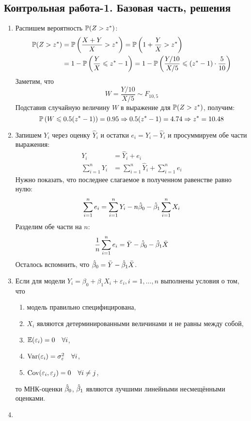 \subsection{Контрольная работа-1. Базовая часть, решения}

\begin{enumerate}
\item Распишем вероятность $\P(Z >z^*)$:
\begin{align*}
\P(Z >z^*) &= \P \left(\frac{X+Y}{X} > z^* \right) = \P \left(1 + \frac{Y}{X} > z^* \right) \\
&= 1 - \P\left(\frac{Y}{X} \leq z^* - 1 \right) = 1 - \P\left(\frac{Y/10}{X/5} \leq \left(z^* - 1\right) \cdot \frac{5}{10} \right)
\end{align*}
Заметим, что
\[
W = \frac{Y/10}{X/5} \sim F_{10,5}
\]
Подставив случайную величину $W$ в выражение для $\P(Z >z^*)$, получим:
\[
\P\left(W \leq 0.5(z^* - 1) \right) = 0.95 \Rightarrow 0.5(z^* - 1) = 4.74 \Rightarrow z^* = 10.48
\]
\item Запишем $Y_i$ через оценку $\hat Y_i$ и остатки $e_i = Y_i - \hat Y_i$ и
просуммируем обе части выражения:
\begin{align*}
Y_i &= \hat Y_i + e_i \\
\sum_{i=1}^n Y_i &= \sum_{i=1}^n \hat Y_i + \sum_{i=1}^n e_i
\end{align*}
Нужно показать, что последнее слагаемое в полученном равенстве равно нулю:
\[
\sum_{i=1}^n e_i = \sum_{i=1}^n Y_i - n\hb_0 - \hb_1 \sum_{i=1}^n X_i
\]
Разделим обе части на $n$:
\[
\frac{1}{n} \sum_{i=1}^n e_i = \bar Y - \hb_0 - \hb_1 \bar X
\]
Осталось вспомнить, что $\hb_0 = \bar Y - \hb_1 \bar X$.
\item Если для модели $Y_i = \beta_0 + \beta_1 X_i + \varepsilon_i, i=1, \ldots, n$
выполнены условия о том, что
\begin{enumerate}
  \item модель правильно специфицирована,
  \item $X_i$ являются детерминированными величинами и не равны между собой,
  \item $\E(\varepsilon_i) = 0 \quad \forall i$,
  \item $\Var(\varepsilon_i) = \sigma^2_{\varepsilon} \quad \forall i$,
  \item $\Cov(\varepsilon_i, \varepsilon_j) = 0 \quad \forall i \neq j$,
\end{enumerate}
то МНК-оценки $\hb_0$, $\hb_1$ являются лучшими линейными несмещёнными оценками.
\item

\end{enumerate}
